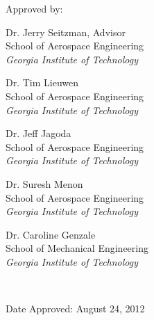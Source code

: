 \thispagestyle{empty}

\begin{center}
  \begin{singlespace}
    \textbf{\thetitle}
  \end{singlespace}
\end{center}

\vfill 

Approved by:

\begin{minipage}[t]{0.4\textwidth}
  \begin{singlespace}
    Dr. Jerry Seitzman, Advisor\\
    School of Aerospace Engineering\\
    \emph{Georgia Institute of Technology}
  \end{singlespace}

  \begin{singlespace}
    Dr. Tim Lieuwen\\
    School of Aerospace Engineering\\
    \emph{Georgia Institute of Technology}
  \end{singlespace}

  \begin{singlespace}
    Dr. Jeff Jagoda\\
    School of Aerospace Engineering\\
    \emph{Georgia Institute of Technology}
  \end{singlespace}
\end{minipage}
\hfill
\begin{minipage}[t]{0.4\textwidth}
  \begin{singlespace}
    Dr. Suresh Menon\\
    School of Aerospace Engineering\\
    \emph{Georgia Institute of Technology}
  \end{singlespace}

  \begin{singlespace}
    Dr. Caroline Genzale\\
    School of Mechanical Engineering\\
    \emph{Georgia Institute of Technology}
  \end{singlespace}
  
  \ \vfill

  Date Approved: August 24, 2012 
\end{minipage}
